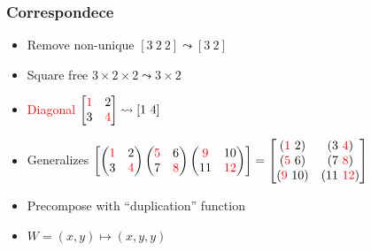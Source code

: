 \documentclass[xetex,mathserif,serif]{beamer}
\let\amsleadsto\leadsto
\let\leadsto\amsleadsto
\newcommand\NB[1]{\textcolor{red}{#1}}
\begin{document}
\begin{frame}
  \frametitle{Correspondece}
  \begin{itemize}%
    \item Remove non-unique $[3\ 2\ 2] \leadsto [3\ 2]$
    \item Square free $3\times 2\times 2\leadsto 3 \times 2$
    \item \NB{Diagonal} $
      \begin{bmatrix}
        \NB 1 & 2 \\
        3 & \NB 4
      \end{bmatrix} \leadsto [1\ 4]
      $
    \item Generalizes $
      \begin{bmatrix}
        \begin{pmatrix}
          \NB 1 & 2 \\ 3 &\NB  4
        \end{pmatrix}
        \begin{pmatrix}
          \NB 5 & 6 \\ 7 & \NB 8
        \end{pmatrix}
        \begin{pmatrix}
          \NB 9 & 10 \\ 11 & \NB{12}
        \end{pmatrix}
      \end{bmatrix} = 
      \begin{bmatrix}
        (\NB 1\ 2) & (3\ \NB 4) \\
        (\NB 5\ 6) & (7\ \NB 8) \\
        (\NB 9\ 10) & (11\ \NB{12})
      \end{bmatrix}  
      $
    \item Precompose with ``duplication'' function
    \item $W = (x, y) \mapsto (x, y, y)$
  \end{itemize}
\end{frame}
\end{document}
